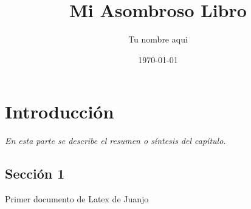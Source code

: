 \documentclass[]{book}
\title{\bf Mi Asombroso Libro}
\author{Tu nombre aqui}
\date{\today}
\begin{document}
\frontmatter
\maketitle
\tableofcontents
\mainmatter
\chapter{Introducción}
\begin{center}
\textit{En esta parte se describe el resumen o síntesis
del capítulo.}
\end{center}
\section{Sección 1}

Primer documento de Latex de Juanjo
\end{document}
